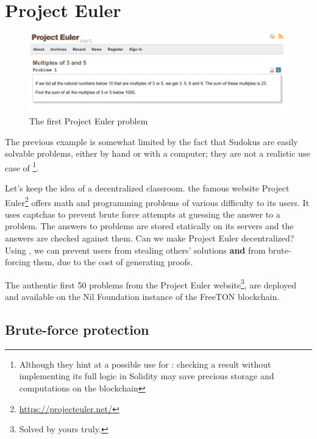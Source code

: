 \documentclass[10pt,a4paper]{article}
\begin{document}
\section{Project Euler}
\label{section_euler}

	\begin{figure}[!h]
	\centering
	\includegraphics[width=\textwidth]{euler}
	\caption{The first Project Euler problem}
\end{figure}

The previous example is somewhat limited by the fact that Sudokus are easily solvable problems, either by hand or with a computer; they are not a realistic use case of \zksnarks{}\footnote{Although they hint at a possible use for \zksnarks{}: checking a result without implementing its full logic in Solidity may save precious storage and computations on the blockchain}.

Let's keep the idea of a decentralized classroom. the famous website Project Euler\footnote{\url{https://projecteuler.net/}} offers math and programming problems of various difficulty to its users. It uses captchas to prevent brute force attempts at guessing the answer to a problem. The answers to problems are stored statically on its servers and the answers are checked against them. Can we make Project Euler decentralized? Using \zksnarks{}, we can prevent users from stealing others' solutions \textbf{and} from brute-forcing them, due to the cost of generating proofs.

The authentic first 50 problems from the Project Euler website\footnote{Solved by yours truly.}, are deployed and available on the Nil Foundation instance of the FreeTON blockchain.

\subsection{Brute-force protection}
\label{subsec:brute-force}
\end{document}
